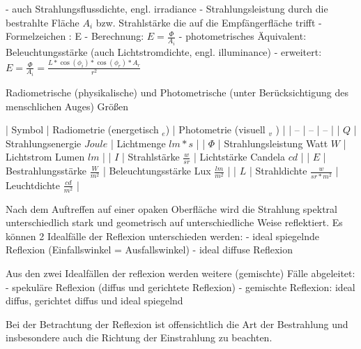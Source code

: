 \documentclass[10pt,landscape]{article}
\makeatletter
\renewcommand{\subsection}{\@startsection{subsection}{2}{0mm}%
                                {-1explus -.5ex minus -.2ex}%
                                {0.5ex plus .2ex}%
                                {\normalfont\normalsize\bfseries}}
\makeatother
\begin{document}
\begin{multicols}{3}
  
  - auch Strahlungsflussdichte, engl. irradiance
  - Strahlungsleistung durch die bestrahlte Fläche $A_i$ bzw. Strahlstärke die auf die Empfängerfläche trifft
  - Formelzeichen : E
  - Berechnung: $E =\frac{\Phi}{A_i}$
  - photometrisches Äquivalent: Beleuchtungsstärke (auch Lichtstromdichte, engl. illuminance)
  - erweitert: $E=\frac{\Phi}{A_i}=\frac{L*\cos(\phi_i)*\cos(\phi_r)*A_r}{r^2}$
  
  Radiometrische (physikalische) und Photometrische (unter Berücksichtigung des menschlichen Auges) Größen
  
  | Symbol | Radiometrie (energetisch $_e$) | Photometrie (visuell $_v$ ) |
  | -- | -- | -- |
  | $Q$ | Strahlungsenergie $Joule$ | Lichtmenge $lm*s$ |
  | $\Phi$ | Strahlungsleistung Watt $W$ | Lichtstrom Lumen $lm$ |
  | $I$ | Strahlstärke $\frac{w}{sr}$ | Lichtstärke Candela $cd$ |
  | $E$ | Bestrahlungsstärke $\frac{W}{m^2}$ | Beleuchtungsstärke Lux $\frac{lm}{m^2}$ |
  | $L$ | Strahldichte $\frac{w}{sr*m^2}$ | Leuchtdichte $\frac{cd}{m^2}$ |
  
  
  
  Nach dem Auftreffen auf einer opaken Oberfläche wird die Strahlung spektral
  unterschiedlich stark und geometrisch auf unterschiedliche Weise reflektiert. Es
  können 2 Idealfälle der Reflexion unterschieden werden:
  - ideal spiegelnde Reflexion (Einfallswinkel = Ausfallswinkel)
  - ideal diffuse Reflexion
  
  Aus den zwei Idealfällen der reflexion werden weitere (gemischte) Fälle abgeleitet:
  - spekuläre Reflexion (diffus und gerichtete Reflexion)
  - gemischte Reflexion: ideal diffus, gerichtet diffus und ideal spiegelnd
  
  Bei der Betrachtung der Reflexion ist offensichtlich die Art der Bestrahlung und
  insbesondere auch die Richtung der Einstrahlung zu beachten.
  
  
  
  

\end{multicols}
\end{document}
